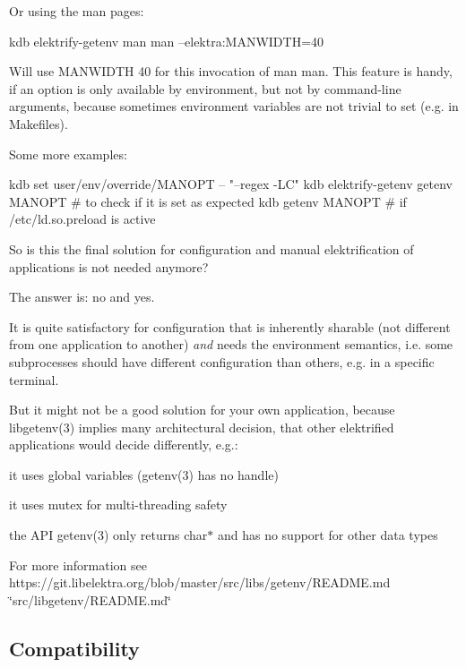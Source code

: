Or using the man pages\+:


\begin{DoxyCode}
kdb elektrify-getenv man man --elektra:MANWIDTH=40
\end{DoxyCode}


Will use M\+A\+N\+W\+I\+D\+TH 40 for this invocation of man man. This feature is handy, if an option is only available by environment, but not by command-\/line arguments, because sometimes environment variables are not trivial to set (e.\+g. in Makefiles).

Some more examples\+:


\begin{DoxyCode}
kdb set user/env/override/MANOPT -- "--regex -LC"
kdb elektrify-getenv getenv MANOPT   # to check if it is set as expected
kdb getenv MANOPT   # if /etc/ld.so.preload is active
\end{DoxyCode}


So is this the final solution for configuration and manual elektrification of applications is not needed anymore?

The answer is\+: no and yes.

It is quite satisfactory for configuration that is inherently sharable (not different from one application to another) {\itshape and} needs the environment semantics, i.\+e. some subprocesses should have different configuration than others, e.\+g. in a specific terminal.

But it might not be a good solution for your own application, because libgetenv(3) implies many architectural decision, that other elektrified applications would decide differently, e.\+g.\+:


\begin{DoxyItemize}
\item it uses global variables (getenv(3) has no handle)
\item it uses mutex for multi-\/threading safety
\item the A\+PI getenv(3) only returns {\ttfamily char$\ast$} and has no support for other data types
\end{DoxyItemize}

For more information see https\+://git.libelektra.\+org/blob/master/src/libs/getenv/\+R\+E\+A\+D\+ME.md \char`\"{}src/libgetenv/\+R\+E\+A\+D\+M\+E.\+md\char`\"{}

\subsection*{Compatibility}


